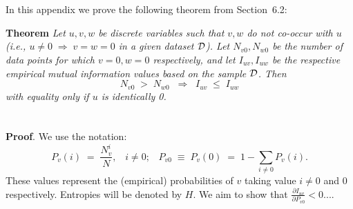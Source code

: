 \documentclass[twoside,11pt]{article}
\newcommand{\dataset}{{\cal D}}
\newcommand{\fracpartial}[2]{\frac{\partial #1}{\partial  #2}}
\begin{document}
\vskip 0.2in

\newpage

\appendix
\section{}
\label{app:theorem}



In this appendix we prove the following theorem from
Section~6.2:

\noindent
{\bf Theorem} {\it Let $u,v,w$ be discrete variables such that $v, w$ do
not co-occur with $u$ (i.e., $u\neq0\;\Rightarrow \;v=w=0$ in a given
dataset $\dataset$). Let $N_{v0},N_{w0}$ be the number of data points for
which $v=0, w=0$ respectively, and let $I_{uv},I_{uw}$ be the
respective empirical mutual information values based on the sample
$\dataset$. Then
\[
	N_{v0} \;>\; N_{w0}\;\;\Rightarrow\;\;I_{uv} \;\leq\;I_{uw}
\]
with equality only if $u$ is identically 0.} \hfill\BlackBox

\section{}

\noindent
{\bf Proof}. We use the notation:
\[
P_v(i) \;=\;\frac{N_v^i}{N},\;\;\;i \neq 0;\;\;\;
P_{v0}\;\equiv\;P_v(0)\; = \;1 - \sum_{i\neq 0}P_v(i).
\]
These values represent the (empirical) probabilities of $v$
taking value $i\neq 0$ and 0 respectively.  Entropies will be denoted
by $H$. We aim to show that $\fracpartial{I_{uv}}{P_{v0}} < 0$....\\
\end{document}

